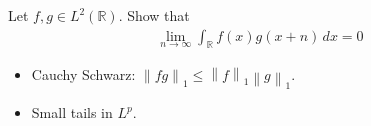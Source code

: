 Let \(f, g \in L^2({\mathbb{R}})\). Show that
\begin{align*}
\lim _{n \to \infty} \int _{{\mathbb{R}}} f(x) g(x+n) \,dx = 0
\end{align*}


\begin{concept}

\envlist

\begin{itemize}
\tightlist
\item
  Cauchy Schwarz:
  \({\left\lVert {fg} \right\rVert}_1 \leq {\left\lVert {f} \right\rVert}_1 {\left\lVert {g} \right\rVert}_1\).
\item
  Small tails in \(L^p\).
\end{itemize}

\end{concept}

